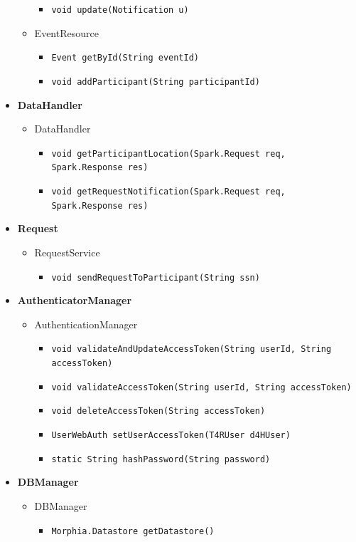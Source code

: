 \documentclass[a4paper, hidelinks, 12pt]{report}
\begin{document}
\begin{itemize}
\begin{itemize}
\begin{itemize}
						\item{\verb|void update(Notification u)|}
					\end{itemize}
				\item{EventResource}
					\begin{itemize}
						\item{\verb|Event getById(String eventId)|}
						\item{\verb|void addParticipant(String participantId)|}
					\end{itemize}
			\end{itemize}
		\item{\textbf{DataHandler}}
			\begin{itemize}
				\item{DataHandler}
					\begin{itemize}
						\item{\verb|void getParticipantLocation(Spark.Request req, Spark.Response res)|}
						\item{\verb|void getRequestNotification(Spark.Request req, Spark.Response res)|}
					\end{itemize}
			\end{itemize}
		\item{\textbf{Request}}
			\begin{itemize}
				\item{RequestService}
					\begin{itemize}
						\item{\verb|void sendRequestToParticipant(String ssn)|}
					\end{itemize}
			\end{itemize}
		\item{\textbf{AuthenticatorManager}}
			\begin{itemize}
				\item{AuthenticationManager}
					\begin{itemize}
						\item{\verb|void validateAndUpdateAccessToken(String userId, String accessToken)|}
						\item{\verb|void validateAccessToken(String userId, String accessToken)|}
						\item{\verb|void deleteAccessToken(String accessToken)|}
						\item{\verb|UserWebAuth setUserAccessToken(T4RUser d4HUser)|}
						\item{\verb|static String hashPassword(String password)|}
					\end{itemize}
			\end{itemize}
		\item{\textbf{DBManager}}
			\begin{itemize}
				\item{DBManager}
					\begin{itemize}
						\item{\verb|Morphia.Datastore getDatastore()|}
					\end{itemize}
			\end{itemize}
	\end{itemize} 
			
\end{document}
